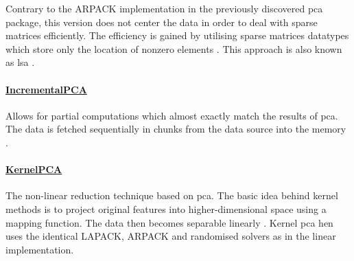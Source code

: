 Contrary to the ARPACK implementation in the previously discovered \gls{pca} package, this version does not center the data in order to deal with sparse matrices efficiently.
The efficiency is gained by utilising sparse matrices datatypes which store only the location of nonzero elements \cite{HandsOnMLCh1}.
This approach is also known as \gls{lsa} \cite{scikit-learn}.


\paragraph{\href{https://scikit-learn.org/stable/modules/generated/sklearn.decomposition.IncrementalPCA.html\#sklearn.decomposition.IncrementalPCA}{IncrementalPCA}}

Allows for partial computations which almost exactly match the results of \gls{pca}.
The data is fetched sequentially in chunks from the data source into the memory \cite{scikit-learn}.


\paragraph{\href{https://scikit-learn.org/stable/modules/generated/sklearn.decomposition.KernelPCA.html\#sklearn.decomposition.KernelPCA}{KernelPCA}}

The non-linear reduction technique based on \gls{pca}.
The basic idea behind kernel methods is to project original features into higher-dimensional space using a mapping function.
The data then becomes separable linearly \cite{PythonMachineLearningCh1}.
Kernel \gls{pca} hen uses the identical LAPACK, ARPACK and randomised solvers as in the linear implementation.


\clearpage
